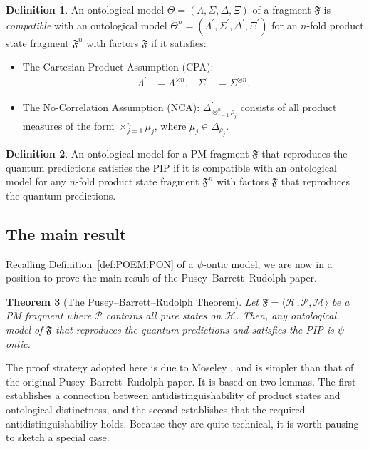 \documentclass[DIV=calc,fontsize=12pt]{scrartcl} %
\theoremstyle{definition}
\newtheorem{definition}{Definition}[section]
\theoremstyle{plain}
\newtheorem{theorem}[definition]{Theorem}
\newcommand{\Hilb}[1][]{\ensuremath{\mathcal{H}_{#1}}}
\begin{document}
\begin{definition}
An ontological model $\Theta = (\Lambda, \Sigma, \Delta, \Xi)$ of a
fragment $\mathfrak{F}$ is \emph{compatible} with an ontological
model $\Theta^n = (\Lambda^{\prime}, \Sigma^{\prime},
\Delta^{\prime}, \Xi^{\prime})$ for an $n$-fold product state
fragment $\mathfrak{F}^n$ with factors $\mathfrak{F}$ if it
satisfies:
\begin{itemize}
\item The Cartesian Product Assumption (CPA):
\begin{align}
\Lambda^{\prime} & = \Lambda^{\times n}, & \Sigma^{\prime} & =
\Sigma^{\otimes n}.
\end{align}
\item The No-Correlation Assumption (NCA):
$\Delta^{\prime}_{\otimes_{j=1}^n \rho_j}$ consists of all product
measures of the form $\times_{j=1}^n\mu_j$, where $\mu_j \in
\Delta_{\rho_j}$.
\end{itemize}
\end{definition}

\begin{definition}
An ontological model for a PM fragment $\mathfrak{F}$ that
reproduces the quantum predictions satisfies the PIP if it is
compatible with an ontological model for any $n$-fold product state
fragment $\mathfrak{F}^n$ with factors $\mathfrak{F}$ that
reproduces the quantum predictions.
\end{definition}

\subsection{The main result}

\label{Main}

Recalling Definition~\ref{def:POEM:PON} of a $\psi$-ontic model, we
are now in a position to prove the main result of the Pusey--Barrett--Rudolph paper.

\begin{theorem}[The Pusey--Barrett--Rudolph Theorem]
\label{thm:Main:Pusey--Barrett--Rudolph}
Let $\mathfrak{F} = \langle \Hilb, \mathcal{P}, \mathcal{M} \rangle$
be a PM fragment where $\mathcal{P}$ contains all
pure states on $\Hilb$.  Then, any ontological model of
$\mathfrak{F}$ that reproduces the quantum predictions and satisfies
the PIP is $\psi$-ontic.
\end{theorem}

The proof strategy adopted here is due to Moseley \cite{Moseley2014},
and is simpler than that of the original Pusey--Barrett--Rudolph paper.  It is based on
two lemmas.  The first establishes a connection between
antidistinguishability of product states and ontological distinctness,
and the second establishes that the required antidistinguishability
holds.  Because they are quite technical, it is worth pausing to
sketch a special case.
\end{document}
